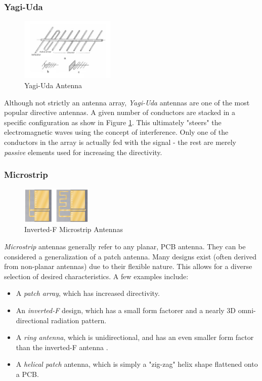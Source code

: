 \subsubsection{Yagi-Uda}
\begin{figure}[!htb]
  \centering
  \includegraphics[width=0.4\textwidth]{yagi}
  \caption{Yagi-Uda Antenna \cite{site-icantennasYagi}}
  \label{fig:yagi}
\end{figure}
Although not strictly an antenna array, \textit{Yagi-Uda} antennas are one of the most popular directive antennas. A given number of conductors are stacked in a specific configuration as show in  Figure \ref{fig:yagi}. This ultimately "steers" the electromagnetic waves using the concept of interference. Only one of the conductors in the array is actually fed with the signal - the rest are merely \textit{passive} elements used for increasing the directivity.

\subsubsection{Microstrip}
\begin{figure}[!htb]
  \centering
  \includegraphics[width=0.3\textwidth]{invertedF}
  \caption{Inverted-F Microstrip Antennas \cite{site-invertedFAntenna}}
  \label{fig:invertedF}
\end{figure}
\textit{Microstrip} antennas generally refer to any planar, PCB antenna. They can be considered a generalization of a patch antenna. Many designs exist (often derived from non-planar antennas) due to their flexible nature. This allows for a diverse selection of desired characteristics. A few examples include:
\begin{itemize}
  \item A \textit{patch array}, which has increased directivity.
  \item An \textit{inverted-F} design, which has a small form factorer and a nearly 3D omni-directional radiation pattern.
  \item A \textit{ring antenna}, which is unidirectional, and has an even smaller form factor than the inverted-F antenna \cite{paper-lowProfileRingAntenna}.
  \item A \textit{helical patch} antenna, which is simply a "zig-zag" helix shape flattened onto a PCB.
\end{itemize}

